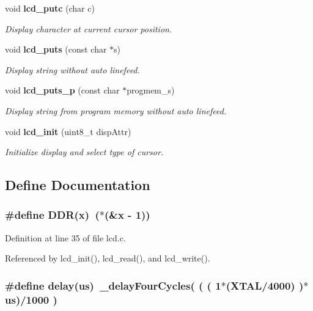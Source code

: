 \begin{CompactItemize}
void {\bf lcd\_\-putc} (char c)
\begin{CompactList}\small\item\em Display character at current cursor position. \item\end{CompactList}\item 
void {\bf lcd\_\-puts} (const char $\ast$s)
\begin{CompactList}\small\item\em Display string without auto linefeed. \item\end{CompactList}\item 
void {\bf lcd\_\-puts\_\-p} (const char $\ast$progmem\_\-s)
\begin{CompactList}\small\item\em Display string from program memory without auto linefeed. \item\end{CompactList}\item 
void {\bf lcd\_\-init} (uint8\_\-t dispAttr)
\begin{CompactList}\small\item\em Initialize display and select type of cursor. \item\end{CompactList}\end{CompactItemize}


\subsection{Define Documentation}
\subsubsection{\setlength{\rightskip}{0pt plus 5cm}\#define DDR(x)~($\ast$(\&x - 1))}\label{lcd_8c_cbe348573e1b5adccdc7bcf157dc6425}




Definition at line 35 of file lcd.c.

Referenced by lcd\_\-init(), lcd\_\-read(), and lcd\_\-write().
\subsubsection{\setlength{\rightskip}{0pt plus 5cm}\#define delay(us)~\_\-delayFourCycles( ( ( 1$\ast$(XTAL/4000) )$\ast$us)/1000 )}\label{lcd_8c_deb129e484b57c960e4a118fab9cdb21}




